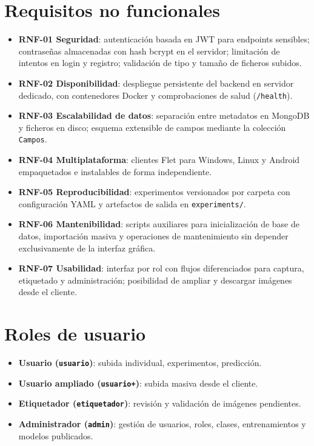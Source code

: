 \documentclass[11pt,spanish,listoffigures,listoftables]{tfgetsinf}
\begin{document}
\section{Requisitos no funcionales}

\begin{itemize}
    \item \textbf{RNF-01 Seguridad}: autenticación basada en JWT para endpoints sensibles; contraseñas almacenadas con hash bcrypt en el servidor; limitación de intentos en login y registro; validación de tipo y tamaño de ficheros subidos.
    \item \textbf{RNF-02 Disponibilidad}: despliegue persistente del backend en servidor dedicado, con contenedores Docker y comprobaciones de salud (\texttt{/health}).
    \item \textbf{RNF-03 Escalabilidad de datos}: separación entre metadatos en MongoDB y ficheros en disco; esquema extensible de campos mediante la colección \texttt{Campos}.
    \item \textbf{RNF-04 Multiplataforma}: clientes Flet para Windows, Linux y Android empaquetados e instalables de forma independiente.
    \item \textbf{RNF-05 Reproducibilidad}: experimentos versionados por carpeta con configuración YAML y artefactos de salida en \texttt{experiments/}.
    \item \textbf{RNF-06 Mantenibilidad}: scripts auxiliares para inicialización de base de datos, importación masiva y operaciones de mantenimiento sin depender exclusivamente de la interfaz gráfica.
    \item \textbf{RNF-07 Usabilidad}: interfaz por rol con flujos diferenciados para captura, etiquetado y administración; posibilidad de ampliar y descargar imágenes desde el cliente.
\end{itemize}

\section{Roles de usuario}

\begin{itemize}
    \item \textbf{Usuario (\texttt{usuario})}: subida individual, experimentos, predicción.
    \item \textbf{Usuario ampliado (\texttt{usuario+})}: subida masiva desde el cliente.
    \item \textbf{Etiquetador (\texttt{etiquetador})}: revisión y validación de imágenes pendientes.
    \item \textbf{Administrador (\texttt{admin})}: gestión de usuarios, roles, clases, entrenamientos y modelos publicados.
\end{itemize}
\end{document}
